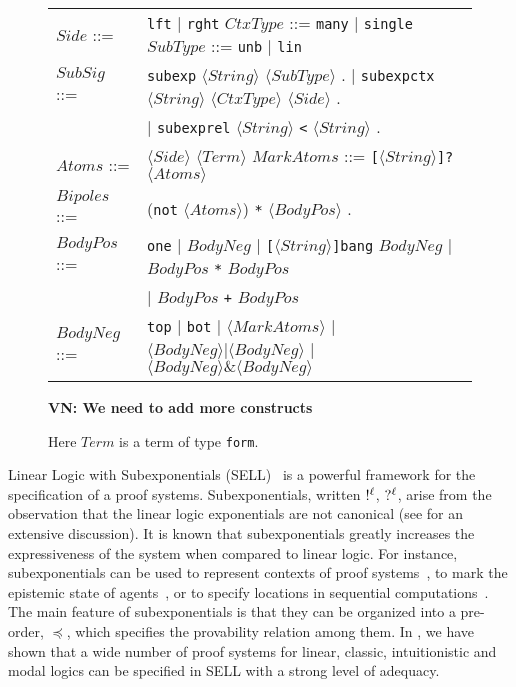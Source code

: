 \documentclass{llncs}
\newcommand{\tup}[1]{\langle#1\rangle}
\newcommand{\nbang}[1]{\hbox{$!^{#1}$}}
\newcommand{\nquest}[1]{\hbox{$?^{#1}$}}
\begin{document}
\begin{figure}[t]
\begin{tabular}{ll}
$Side$ ::= & \texttt{lft} $\mid$ \texttt{rght}  \quad $CtxType$ ::=  \texttt{many} $\mid$ \texttt{single} \quad $SubType$ ::=  \texttt{unb} $\mid$ \texttt{lin} \\[2pt]
$SubSig$ ::= & 
{\texttt{subexp} $\tup{String}$ $\tup{SubType}$ .  $\mid$  \texttt{subexpctx} $\tup{String}$ $\tup{CtxType}$ $\tup{Side}$ .}
\\
& {$\mid $ \texttt{subexprel} $\tup{String}$ \texttt{<} $\tup{String}$ .}\\[2pt]
$Atoms$ ::= & $\tup{Side}$ $\tup{Term}$ \quad $MarkAtoms$ ::=  \texttt{[}$\tup{String}$\texttt{]?} $\tup{Atoms}$ \\[2pt]
$Bipoles$ ::= & ({\texttt{not} $\tup{Atoms}$) \texttt{*} $\tup{BodyPos}$} . \\[2pt]
$BodyPos$ ::= & \texttt{one} $\mid$ $BodyNeg$ $\mid$ \texttt{[}$\tup{String}$\texttt{]bang} $BodyNeg$ $\mid$ $BodyPos$ \texttt{*} $BodyPos$ \\ & $\mid$ $BodyPos$ \texttt{+} $BodyPos$ \\[2pt]
$BodyNeg$ ::= & 
{\texttt{top} $\mid$ \texttt{bot} $\mid$ $\tup{MarkAtoms}$ $\mid$ $\tup{BodyNeg} | \tup{BodyNeg}$ $\mid$ $\tup{BodyNeg} \& \tup{BodyNeg}$ }
\end{tabular}
\textbf{VN: We need to add more constructs}
\caption{Here $Term$ is a term of type \texttt{form}.} 
\label{fig:syntax}
\end{figure}

Linear Logic with Subexponentials (SELL)~\cite{nigam09ppdp} is a powerful framework for the specification of a proof systems. 
Subexponentials, written $\nbang{\ell}$, $\nquest{\ell}$, arise from the observation that the linear logic exponentials are not canonical (see \cite{nigam.jlc} for an extensive
discussion). It is known  that subexponentials greatly increases
the expressiveness of the system when compared to linear logic. For instance,
subexponentials can be used to represent contexts of proof
systems~\cite{nigam.jlc}, to mark the epistemic state of
agents~\cite{nigam12lics}, or to specify locations in sequential
computations~\cite{nigam09ppdp}. 
The main feature of subexponentials is that they can be organized into a pre-order, $\preceq$, which specifies
the provability relation among them. 
In \cite{nigam.jlc}, we have shown that a wide number of proof systems for linear, classic, intuitionistic and 
modal logics can be specified in SELL with a strong level of adequacy. 
\end{document}
